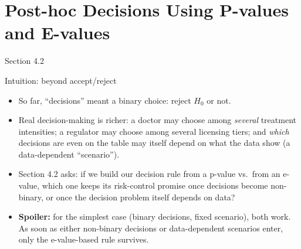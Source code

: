 \documentclass[aspectratio=169,10pt]{beamer}
\begin{document}
\section{Post-hoc Decisions Using P-values and E-values}

\begin{frame}{Section 4.2}
  \tableofcontents[currentsection]
\end{frame}

\begin{frame}{Intuition: beyond accept/reject}
  \begin{itemize}
    \item So far, ``decisions'' meant a binary choice: reject $H_0$ or not.
    \item Real decision-making is richer: a doctor may choose among
    \emph{several} treatment intensities; a regulator may choose among
    several licensing tiers; and \emph{which} decisions are even on the
    table may itself depend on what the data show (a data-dependent
    ``scenario'').
    \item Section 4.2 asks: if we build our decision rule from a p-value vs.\
    from an e-value, which one keeps its risk-control promise once decisions
    become non-binary, or once the decision problem itself depends on data?
    \item \textbf{Spoiler:} for the simplest case (binary decisions, fixed
    scenario), both work. As soon as either non-binary decisions or
    data-dependent scenarios enter, only the e-value-based rule survives.
  \end{itemize}
\end{frame}
\end{document}
